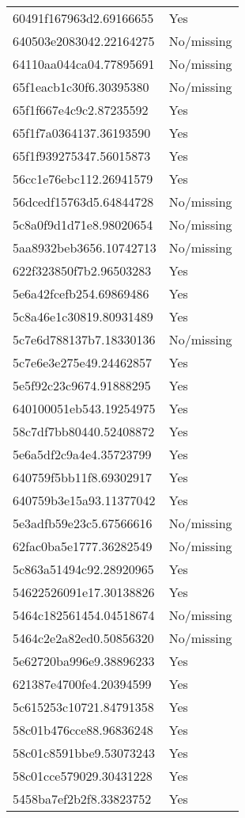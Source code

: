 \begin{tabular}{ll}
60491f167963d2.69166655 & Yes \\
640503e2083042.22164275 & No/missing \\
64110aa044ca04.77895691 & No/missing \\
65f1eacb1c30f6.30395380 & No/missing \\
65f1f667e4c9c2.87235592 & Yes \\
65f1f7a0364137.36193590 & Yes \\
65f1f939275347.56015873 & Yes \\
56cc1e76ebc112.26941579 & Yes \\
56dcedf15763d5.64844728 & No/missing \\
5c8a0f9d1d71e8.98020654 & No/missing \\
5aa8932beb3656.10742713 & No/missing \\
622f323850f7b2.96503283 & Yes \\
5e6a42fcefb254.69869486 & Yes \\
5c8a46e1c30819.80931489 & Yes \\
5c7e6d788137b7.18330136 & No/missing \\
5c7e6e3e275e49.24462857 & Yes \\
5e5f92c23c9674.91888295 & Yes \\
640100051eb543.19254975 & Yes \\
58c7df7bb80440.52408872 & Yes \\
5e6a5df2c9a4e4.35723799 & Yes \\
640759f5bb11f8.69302917 & Yes \\
640759b3e15a93.11377042 & Yes \\
5e3adfb59e23c5.67566616 & No/missing \\
62fac0ba5e1777.36282549 & No/missing \\
5c863a51494c92.28920965 & Yes \\
54622526091e17.30138826 & Yes \\
5464c182561454.04518674 & No/missing \\
5464c2e2a82ed0.50856320 & No/missing \\
5e62720ba996e9.38896233 & Yes \\
621387e4700fe4.20394599 & Yes \\
5c615253c10721.84791358 & Yes \\
58c01b476cce88.96836248 & Yes \\
58c01c8591bbe9.53073243 & Yes \\
58c01cce579029.30431228 & Yes \\
5458ba7ef2b2f8.33823752 & Yes \\

\end{tabular}
